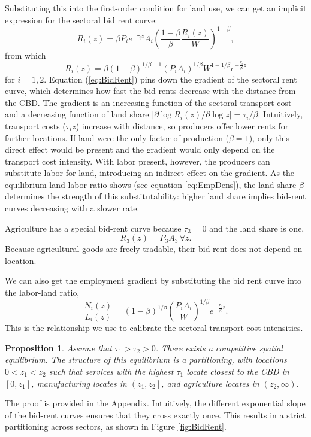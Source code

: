 \documentclass[12pt]{article}
\newtheorem{proposition}{Proposition}
\begin{document}
Substituting this into the first-order condition for land use, we can get an implicit expression for the sectoral bid rent curve:
\[
R_i(z) =\beta P_ie^{-\tau_i z}A_i \left(\frac{1-\beta}{\beta}\frac{R_i(z)}{W}\right)^{1-\beta},
\]
from which
\begin{equation}
\label{eq:BidRent}
R_i(z) =\beta(1-\beta)^{1/\beta-1} (P_iA_i)^{1/\beta} W^{1-1/\beta} e^{-\frac{\tau_i}{\beta} z}
\end{equation}
for $i=1,2$. Equation (\ref{eq:BidRent}) pins down the gradient of the sectoral rent curve, which determines how fast the bid-rents decrease with the distance from the CBD. The gradient is an increasing function of the sectoral transport cost and a decreasing function of land share $|\partial\log R_i(z)/\partial \log z|=\tau_i/\beta$. Intuitively, transport costs ($\tau_iz$) increase with distance, so producers offer lower rents for farther locations. If land were the only factor of production ($\beta=1$), only this direct effect would be present and the gradient would only depend on the transport cost intensity. With labor present, however, the producers can substitute labor for land, introducing an indirect effect on the gradient. As the equilibrium land-labor ratio shows (see equation \ref{eq:EmpDens}), the land share $\beta$ determines the strength of this substitutability: higher land share implies bid-rent curves decreasing with a slower rate.

Agriculture has a special bid-rent curve because $\tau_3=0$ and the land share is one,
\begin{equation}
\label{eq:BidRent:agri}
R_3(z) =P_3A_3 \, \forall z.
\end{equation}
Because agricultural goods are freely tradable, their bid-rent does not depend on location.

We can also get the employment gradient by substituting the bid rent curve into the labor-land ratio,
\begin{equation}
\label{eq:EmpGrad}
\frac{N_i(z)}{L_i(z)} = (1-\beta)^{1/\beta} \left(\frac{P_iA_i}{W}\right)^{1/\beta} e^{-\frac{\tau_i}{\beta} z}.
\end{equation}
This is the relationship we use to calibrate the sectoral transport cost intensities.

\begin{proposition}\label{prop:existence}
Assume that $\tau_1>\tau_2>0$. There exists a competitive spatial equilibrium. The structure of this equilibrium is a partitioning, with locations $0<z_1<z_2$ such that services with the highest $\tau_1$ locate closest to the CBD in $\left[0,z_1\right]$, manufacturing locates in $\left(z_1,z_2\right]$, and agriculture locates in $(z_2,\infty)$.
\end{proposition}
The proof is provided in the Appendix. Intuitively, the different exponential slope of the bid-rent curves ensures that they cross exactly once. This results in a strict partitioning across sectors, as shown in Figure \ref{fig:BidRent}. 
\end{document}

